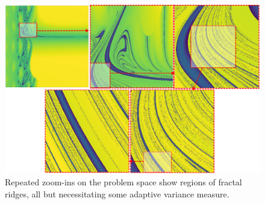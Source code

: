 \begin{figure}[h]
    \centering
    \includegraphics[width=\linewidth]{fig/consecutivezoom.png}
    \caption{Repeated zoom-ins on the problem space show regions of fractal ridges, all but necessitating some adaptive variance measure. }
    \label{fig:consecutivezoom}
\end{figure} 

